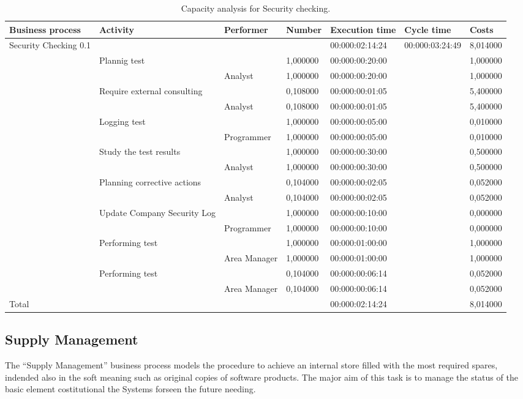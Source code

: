 \begin{landscape}
\begin{table}
\centering
{\tiny
\begin{tabular}{|l|l|l|l|l|l|l|}
Business process&Activity&Performer&Number&Execution time&Cycle time&Costs\\
\hline
Security Checking 0.1&&&&00:000:02:14:24&00:000:03:24:49&8,014000\\
\hline
&Plannig test &&1,000000&00:000:00:20:00&&1,000000\\
\hline
&&Analyst &1,000000&00:000:00:20:00&&1,000000\\
\hline
&Require external consulting &&0,108000&00:000:00:01:05&&5,400000\\
\hline
&&Analyst &0,108000&00:000:00:01:05&&5,400000\\
\hline
&Logging test &&1,000000&00:000:00:05:00&&0,010000\\
\hline
&&Programmer &1,000000&00:000:00:05:00&&0,010000\\
\hline
&Study the test results &&1,000000&00:000:00:30:00&&0,500000\\
\hline
&&Analyst &1,000000&00:000:00:30:00&&0,500000\\
\hline
&Planning corrective actions &&0,104000&00:000:00:02:05&&0,052000\\
\hline
&&Analyst &0,104000&00:000:00:02:05&&0,052000\\
\hline
&Update Company Security Log &&1,000000&00:000:00:10:00&&0,000000\\
\hline
&&Programmer &1,000000&00:000:00:10:00&&0,000000\\
\hline
&Performing test &&1,000000&00:000:01:00:00&&1,000000\\
\hline
&&Area Manager &1,000000&00:000:01:00:00&&1,000000\\
\hline
&Performing test &&0,104000&00:000:00:06:14&&0,052000\\
\hline
&&Area Manager &0,104000&00:000:00:06:14&&0,052000\\
\hline
Total&&&&00:000:02:14:24&&8,014000
\end{tabular}
}
\caption{Capacity analysis for Security checking.}
\end{table}
\end{landscape}
%

%

\subsection{Supply Management}
The ``Supply Management'' business process models the procedure to achieve an internal store filled with the most required spares, indended also in the soft meaning such as original copies of software products. The major aim of this task is to manage the status of the basic element costitutional the Systems forseen the future needing.


